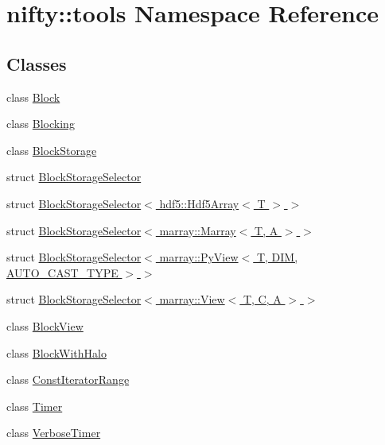\hypertarget{namespacenifty_1_1tools}{}\section{nifty\+:\+:tools Namespace Reference}
\label{namespacenifty_1_1tools}
\subsection*{Classes}
\begin{DoxyCompactItemize}
\item 
class \hyperlink{classnifty_1_1tools_1_1Block}{Block}
\item 
class \hyperlink{classnifty_1_1tools_1_1Blocking}{Blocking}
\item 
class \hyperlink{classnifty_1_1tools_1_1BlockStorage}{Block\+Storage}
\item 
struct \hyperlink{structnifty_1_1tools_1_1BlockStorageSelector}{Block\+Storage\+Selector}
\item 
struct \hyperlink{structnifty_1_1tools_1_1BlockStorageSelector_3_01hdf5_1_1Hdf5Array_3_01T_01_4_01_4}{Block\+Storage\+Selector$<$ hdf5\+::\+Hdf5\+Array$<$ T $>$ $>$}
\item 
struct \hyperlink{structnifty_1_1tools_1_1BlockStorageSelector_3_01marray_1_1Marray_3_01T_00_01A_01_4_01_4}{Block\+Storage\+Selector$<$ marray\+::\+Marray$<$ T, A $>$ $>$}
\item 
struct \hyperlink{structnifty_1_1tools_1_1BlockStorageSelector_3_01marray_1_1PyView_3_01T_00_01DIM_00_01AUTO__CAST__TYPE_01_4_01_4}{Block\+Storage\+Selector$<$ marray\+::\+Py\+View$<$ T, D\+I\+M, A\+U\+T\+O\+\_\+\+C\+A\+S\+T\+\_\+\+T\+Y\+P\+E $>$ $>$}
\item 
struct \hyperlink{structnifty_1_1tools_1_1BlockStorageSelector_3_01marray_1_1View_3_01T_00_01C_00_01A_01_4_01_4}{Block\+Storage\+Selector$<$ marray\+::\+View$<$ T, C, A $>$ $>$}
\item 
class \hyperlink{classnifty_1_1tools_1_1BlockView}{Block\+View}
\item 
class \hyperlink{classnifty_1_1tools_1_1BlockWithHalo}{Block\+With\+Halo}
\item 
class \hyperlink{classnifty_1_1tools_1_1ConstIteratorRange}{Const\+Iterator\+Range}
\item 
class \hyperlink{classnifty_1_1tools_1_1Timer}{Timer}
\item 
class \hyperlink{classnifty_1_1tools_1_1VerboseTimer}{Verbose\+Timer}
\end{DoxyCompactItemize}
